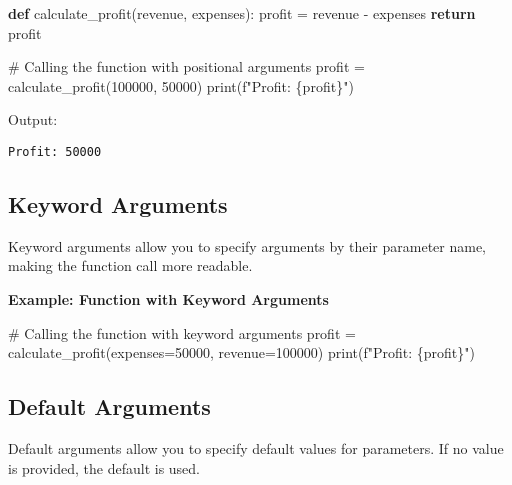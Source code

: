 \documentclass[
  letterpaper,
  DIV=11,
  numbers=noendperiod]{scrreprt}
\newenvironment{Shaded}{\begin{snugshade}}{\end{snugshade}}
\newcommand{\BuiltInTok}[1]{\textcolor[rgb]{0.00,0.23,0.31}{#1}}
\newcommand{\CommentTok}[1]{\textcolor[rgb]{0.37,0.37,0.37}{#1}}
\newcommand{\ControlFlowTok}[1]{\textcolor[rgb]{0.00,0.23,0.31}{\textbf{#1}}}
\newcommand{\DecValTok}[1]{\textcolor[rgb]{0.68,0.00,0.00}{#1}}
\newcommand{\KeywordTok}[1]{\textcolor[rgb]{0.00,0.23,0.31}{\textbf{#1}}}
\newcommand{\NormalTok}[1]{\textcolor[rgb]{0.00,0.23,0.31}{#1}}
\newcommand{\OperatorTok}[1]{\textcolor[rgb]{0.37,0.37,0.37}{#1}}
\newcommand{\SpecialCharTok}[1]{\textcolor[rgb]{0.37,0.37,0.37}{#1}}
\newcommand{\SpecialStringTok}[1]{\textcolor[rgb]{0.13,0.47,0.30}{#1}}
\begin{document}
\begin{Shaded}
\begin{Highlighting}[]
\KeywordTok{def}\NormalTok{ calculate\_profit(revenue, expenses):}
\NormalTok{    profit }\OperatorTok{=}\NormalTok{ revenue }\OperatorTok{{-}}\NormalTok{ expenses}
    \ControlFlowTok{return}\NormalTok{ profit}

\CommentTok{\# Calling the function with positional arguments}
\NormalTok{profit }\OperatorTok{=}\NormalTok{ calculate\_profit(}\DecValTok{100000}\NormalTok{, }\DecValTok{50000}\NormalTok{)}
\BuiltInTok{print}\NormalTok{(}\SpecialStringTok{f"Profit: }\SpecialCharTok{\{}\NormalTok{profit}\SpecialCharTok{\}}\SpecialStringTok{"}\NormalTok{)}
\end{Highlighting}
\end{Shaded}

Output:

\begin{verbatim}
Profit: 50000
\end{verbatim}

\subsection{Keyword Arguments}\label{keyword-arguments-1}

Keyword arguments allow you to specify arguments by their parameter
name, making the function call more readable.

\textbf{Example: Function with Keyword Arguments}

\begin{Shaded}
\begin{Highlighting}[]
\CommentTok{\# Calling the function with keyword arguments}
\NormalTok{profit }\OperatorTok{=}\NormalTok{ calculate\_profit(expenses}\OperatorTok{=}\DecValTok{50000}\NormalTok{, revenue}\OperatorTok{=}\DecValTok{100000}\NormalTok{)}
\BuiltInTok{print}\NormalTok{(}\SpecialStringTok{f"Profit: }\SpecialCharTok{\{}\NormalTok{profit}\SpecialCharTok{\}}\SpecialStringTok{"}\NormalTok{)}
\end{Highlighting}
\end{Shaded}

\subsection{Default Arguments}\label{default-arguments}

Default arguments allow you to specify default values for parameters. If
no value is provided, the default is used.
\end{document}

